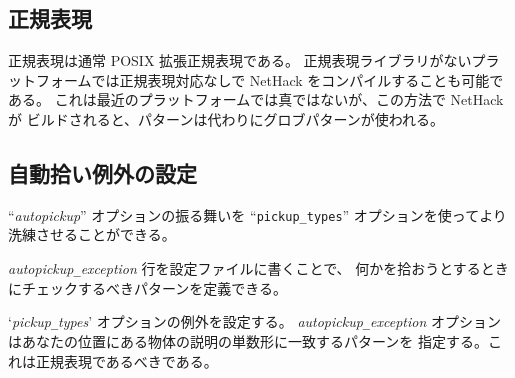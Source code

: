 \subsection*{正規表現}

正規表現は通常 POSIX 拡張正規表現である。
正規表現ライブラリがないプラットフォームでは正規表現対応なしで
NetHack をコンパイルすることも可能である。
これは最近のプラットフォームでは真ではないが、この方法で NetHack が
ビルドされると、パターンは代わりにグロブパターンが使われる。

\subsection*{自動拾い例外の設定}

``{\it autopickup\/}'' オプションの振る舞いを
``{\tt pickup\verb+_+types}'' オプションを使ってより洗練させることができる。

{\it autopickup\verb+_+exception\/}
行を設定ファイルに書くことで、
何かを拾おうとするときにチェックするべきパターンを定義できる。

\blist{}
\item[\ib{autopickup\verb+_+exception}]
`{\it pickup\verb+_+types\/}' オプションの例外を設定する。
{\it autopickup\verb+_+exception\/}
オプションはあなたの位置にある物体の説明の単数形に一致するパターンを
指定する。これは正規表現であるべきである。

